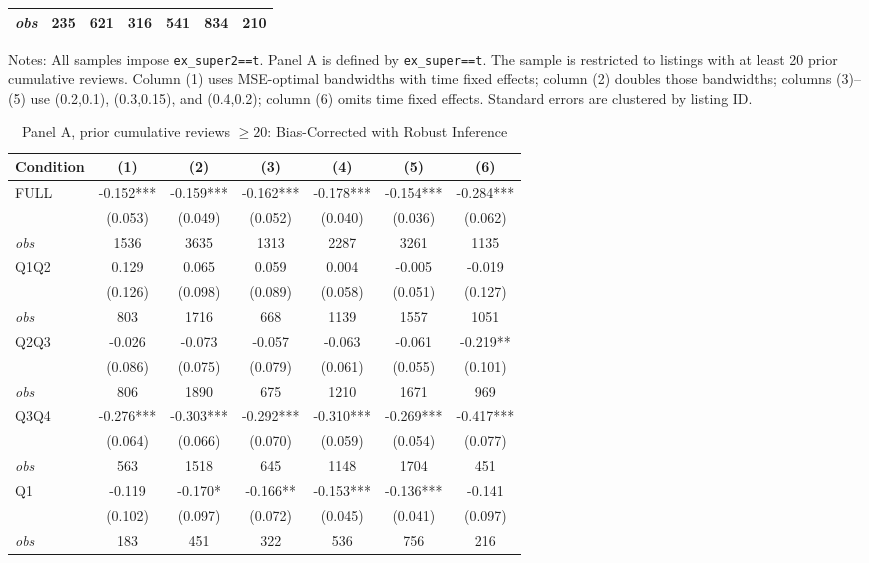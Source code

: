 \begin{table}[!htbp]
\begin{tabular}{lcccccc}
\textit{obs} & 235 & 621 & 316 & 541 & 834 & 210 \\
\bottomrule
\end{tabular}
\begin{minipage}{0.98\textwidth}\footnotesize
Notes: All samples impose \texttt{ex\_super2==t}. Panel A is defined by \texttt{ex\_super==t}. The sample is restricted to listings with at least 20 prior cumulative reviews. Column (1) uses MSE-optimal bandwidths with time fixed effects; column (2) doubles those bandwidths; columns (3)--(5) use (0.2,0.1), (0.3,0.15), and (0.4,0.2); column (6) omits time fixed effects. Standard errors are clustered by listing ID.
\end{minipage}
\end{table}

\begin{table}[!htbp]
\centering
\caption{Panel A, prior cumulative reviews $\geq20$: Bias-Corrected with Robust Inference}
\begin{tabular}{lcccccc}
\toprule
Condition & (1) & (2) & (3) & (4) & (5) & (6) \\
\midrule
FULL & -0.152*** & -0.159*** & -0.162*** & -0.178*** & -0.154*** & -0.284*** \\
 & (0.053) & (0.049) & (0.052) & (0.040) & (0.036) & (0.062) \\
\textit{obs} & 1536 & 3635 & 1313 & 2287 & 3261 & 1135 \\
Q1Q2 & 0.129 & 0.065 & 0.059 & 0.004 & -0.005 & -0.019 \\
 & (0.126) & (0.098) & (0.089) & (0.058) & (0.051) & (0.127) \\
\textit{obs} & 803 & 1716 & 668 & 1139 & 1557 & 1051 \\
Q2Q3 & -0.026 & -0.073 & -0.057 & -0.063 & -0.061 & -0.219** \\
 & (0.086) & (0.075) & (0.079) & (0.061) & (0.055) & (0.101) \\
\textit{obs} & 806 & 1890 & 675 & 1210 & 1671 & 969 \\
Q3Q4 & -0.276*** & -0.303*** & -0.292*** & -0.310*** & -0.269*** & -0.417*** \\
 & (0.064) & (0.066) & (0.070) & (0.059) & (0.054) & (0.077) \\
\textit{obs} & 563 & 1518 & 645 & 1148 & 1704 & 451 \\
Q1 & -0.119 & -0.170* & -0.166** & -0.153*** & -0.136*** & -0.141 \\
 & (0.102) & (0.097) & (0.072) & (0.045) & (0.041) & (0.097) \\
\textit{obs} & 183 & 451 & 322 & 536 & 756 & 216 \\

\end{tabular}
\end{table}
